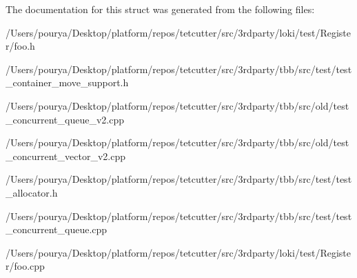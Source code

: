 The documentation for this struct was generated from the following files\+:\begin{DoxyCompactItemize}
\item 
/\+Users/pourya/\+Desktop/platform/repos/tetcutter/src/3rdparty/loki/test/\+Register/foo.\+h\item 
/\+Users/pourya/\+Desktop/platform/repos/tetcutter/src/3rdparty/tbb/src/test/test\+\_\+container\+\_\+move\+\_\+support.\+h\item 
/\+Users/pourya/\+Desktop/platform/repos/tetcutter/src/3rdparty/tbb/src/old/test\+\_\+concurrent\+\_\+queue\+\_\+v2.\+cpp\item 
/\+Users/pourya/\+Desktop/platform/repos/tetcutter/src/3rdparty/tbb/src/old/test\+\_\+concurrent\+\_\+vector\+\_\+v2.\+cpp\item 
/\+Users/pourya/\+Desktop/platform/repos/tetcutter/src/3rdparty/tbb/src/test/test\+\_\+allocator.\+h\item 
/\+Users/pourya/\+Desktop/platform/repos/tetcutter/src/3rdparty/tbb/src/test/test\+\_\+concurrent\+\_\+queue.\+cpp\item 
/\+Users/pourya/\+Desktop/platform/repos/tetcutter/src/3rdparty/loki/test/\+Register/foo.\+cpp\end{DoxyCompactItemize}
